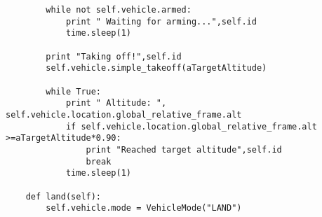 \begin{lstlisting}
        while not self.vehicle.armed:      
            print " Waiting for arming...",self.id
            time.sleep(1)

        print "Taking off!",self.id
        self.vehicle.simple_takeoff(aTargetAltitude)

        while True:
            print " Altitude: ", self.vehicle.location.global_relative_frame.alt      
            if self.vehicle.location.global_relative_frame.alt >=aTargetAltitude*0.90: 
                print "Reached target altitude",self.id
                break
            time.sleep(1)

    def land(self):
        self.vehicle.mode = VehicleMode("LAND")


\end{lstlisting}
